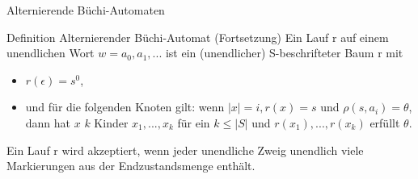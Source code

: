 \begin{frame}{Alternierende Büchi-Automaten}
\begin{block}{Definition Alternierender Büchi-Automat (Fortsetzung)}
Ein Lauf r auf einem unendlichen Wort $w=a_0,a_1,...$ ist ein (unendlicher) S-beschrifteter Baum r mit
\begin{itemize}
\setlength\itemsep{1em}
\item $r(\epsilon)=s^0$,
\pause
\item und für die folgenden Knoten gilt: wenn $|x|=i, r(x)=s$ und $\rho(s,a_i)=\theta$, dann hat $x$ $k$ Kinder $x_1,...,x_k$ für ein $k \leq |S|$ und $r(x_1),...,r(x_k)$ erfüllt $\theta$.
\end{itemize}
\pause
\vspace{1em}
Ein Lauf r wird akzeptiert, wenn jeder unendliche Zweig unendlich viele Markierungen aus der Endzustandsmenge enthält.
\end{block}
\end{frame}

